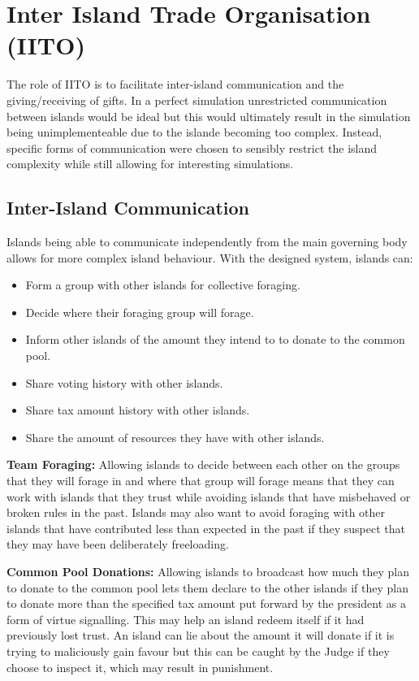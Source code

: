 \chapter{Inter Island Trade Organisation (IITO)}

The role of IITO is to facilitate inter-island communication and the giving/receiving of gifts. In a perfect simulation unrestricted communication between islands would be ideal but this would ultimately result in the simulation being unimplementeable due to the islande becoming too complex. Instead, specific forms of communication were chosen to sensibly restrict the island complexity while still allowing for interesting simulations.

\section{Inter-Island Communication}  
\label{sec:IITO:inter_island_communication}

Islands being able to communicate independently from the main governing body allows for more complex island behaviour. With the designed system, islands can:

\begin{itemize}
    \item Form a group with other islands for collective foraging.
    \item Decide where their foraging group will forage.
    \item Inform other islands of the amount they intend to to donate to the common pool.
    \item Share voting history with other islands.
    \item Share tax amount history with other islands.
    \item Share the amount of resources they have with other islands.
\end{itemize}

\textbf{Team Foraging: }Allowing islands to decide between each other on the groups that they will forage in and where that group will forage means that they can work with islands that they trust while avoiding islands that have misbehaved or broken rules in the past. Islands may also want to avoid foraging with other islands that have contributed less than expected in the past if they suspect that they may have been deliberately freeloading.

\textbf{Common Pool Donations: }Allowing islands to broadcast how much they plan to donate to the common pool lets them declare to the other islands if they plan to donate more than the specified tax amount put forward by the president as a form of virtue signalling. This may help an island redeem itself if it had previously lost trust. An island can lie about the amount it will donate if it is trying to maliciously gain favour but this can be caught by the Judge if they choose to inspect it, which may result in punishment.

